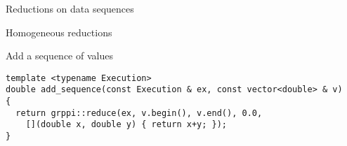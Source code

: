 \begin{frame}[t]{Reductions on data sequences}
\begin{itemize}
\end{itemize}
\end{frame}

\begin{frame}[t,fragile]{Homogeneous reductions}
\begin{block}{Add a sequence of values}
\begin{lstlisting}
template <typename Execution>
double add_sequence(const Execution & ex, const vector<double> & v)
{
  return grppi::reduce(ex, v.begin(), v.end(), 0.0,
    [](double x, double y) { return x+y; });
}
\end{lstlisting}
\end{block}
\end{frame}
